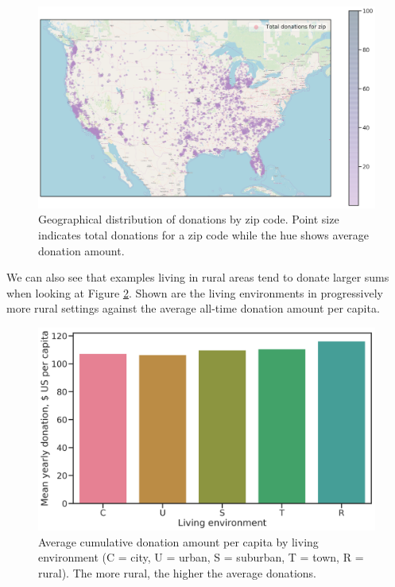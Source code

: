 \documentclass[
  11pt,
  a4paper,
  DIV=12,captions=tableheading,oneside,titlepage]{scrbook}
\begin{document}
\begin{figure}

{\centering \includegraphics[width=1\linewidth]{figures/eda/donations-geographical} 

}

\caption{Geographical distribution of donations by zip code. Point size indicates total donations for a zip code while the hue shows average donation amount.}\label{fig:donations-geo}
\end{figure}

We can also see that examples living in rural areas tend to donate larger sums when looking at Figure \ref{fig:donations-le}. Shown are the living environments in progressively more rural settings against the average all-time donation amount per capita.



\begin{figure}

{\centering \includegraphics[width=0.7\linewidth]{figures/eda/avg-donations-per-capita-by-living-environment} 

}

\caption{Average cumulative donation amount per capita by living environment (C = city, U = urban, S = suburban, T = town, R = rural). The more rural, the higher the average donations.}\label{fig:donations-le}
\end{figure}
\end{document}
